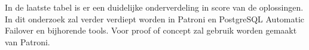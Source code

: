 \caption[Tabel 5: Requirementanalyse alle oplossingen]
\newline

In de laatste tabel is er een duidelijke onderverdeling in score van de oplossingen. In dit onderzoek zal verder verdiept worden in Patroni en PostgreSQL Automatic Failover en bijhorende tools. Voor proof of concept zal gebruik worden gemaakt van Patroni.

